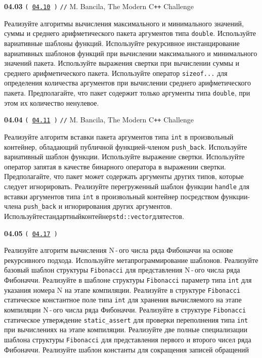 \documentclass[a4paper,12pt]{article}
\begin{document}
\bigskip

{\large \textbf{04.03} \texttt{(\,\href{https://github.com/i-s-m-mipt/Education/blob/master/projects/examples/source/04.10.cpp}{04.10}\,)} \texttt{//} M. Bancila, The Modern C\texttt{++} Challenge}

\bigskip

Реализуйте алгоритмы вычисления максимального и минимального значений, суммы и среднего арифметического пакета аргументов типа \lstinline{double}. Используйте вариативные шаблоны функций. Используйте рекурсивное инстанцирование вариативных шаблонов функций при вычислении максимального и минимального значений пакета. Используйте выражения свертки при вычислении суммы и среднего арифметического пакета. Используйте оператор \lstinline{sizeof...} для определения количества аргументов при вычислении среднего арифметического пакета. Предполагайте, что пакет содержит только аргументы типа \lstinline{double}, при этом их количество ненулевое.

\bigskip

{\large \textbf{04.04} \texttt{(\,\href{https://github.com/i-s-m-mipt/Education/blob/master/projects/examples/source/04.11.cpp}{04.11}\,)} \texttt{//} M. Bancila, The Modern C\texttt{++} Challenge}

\bigskip

Реализуйте алгоритм вставки пакета аргументов типа \lstinline{int} в произвольный контейнер, обладающий публичной функцией-членом \lstinline{push_back}. Используйте вариативный шаблон функции. Используйте выражение свертки. Используйте оператор запятая в качестве бинарного оператора в выражении свертки. Предполагайте, что пакет может содержать аргументы других типов, которые следует игнорировать. Реализуйте перегруженный шаблон функции \lstinline{handle} для вставки аргументов типа \lstinline{int} в произвольный контейнер посредством функции-члена \lstinline{push_back} и игнорирования других аргументов. Используйте\:стандартный\:контейнер\:\lstinline{std::vector}\:для\:тестов.

\bigskip

{\large \textbf{04.05} \texttt{(\,\href{https://github.com/i-s-m-mipt/Education/blob/master/projects/examples/source/04.17.cpp}{04.17}\,)}}

\bigskip

Реализуйте алгоритм вычисления N\,-\,ого числа ряда Фибоначчи на основе рекурсивного подхода. Используйте метапрограммирование шаблонов. Реализуйте базовый шаблон структуры \lstinline{Fibonacci} для представления N\,-\,ого числа ряда Фибоначчи. Реализуйте в шаблоне структуры \lstinline{Fibonacci} параметр типа \lstinline{int} для указания номера N на этапе компиляции. Реализуйте в структуре \lstinline{Fibonacci} статическое константное поле типа \lstinline{int} для хранения вычисляемого на этапе компиляции N\,-\,ого числа ряда Фибоначчи. Реализуйте в структуре \lstinline{Fibonacci} статическое утверждение \lstinline{static_assert} для проверки переполнения типа \lstinline{int} при вычислениях на этапе компиляции. Реализуйте две полные специализации шаблона структуры \lstinline{Fibonacci} для представления первого и второго чисел ряда Фибоначчи. Реализуйте шаблон константы для сокращения записей обращений 
\end{document}
